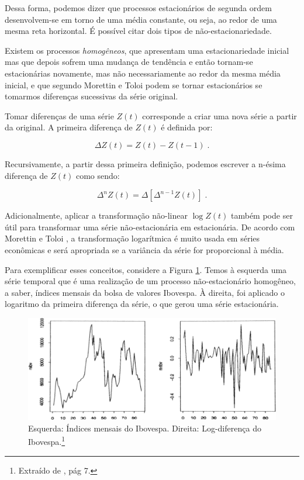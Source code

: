 Dessa forma, podemos dizer que processos estacionários de segunda ordem desenvolvem-se em torno de uma média constante, ou seja, ao redor de uma mesma reta horizontal. É possível citar dois tipos de não-estacionariedade. 

Existem os processos \emph{homogêneos}, que apresentam uma estacionariedade inicial mas que depois sofrem uma mudança de tendência e então tornam-se estacionárias novamente, mas não necessariamente ao redor da mesma média inicial, e que segundo Morettin e Toloi \citep{morettin} podem se tornar estacionários se tomarmos diferenças sucessivas da série original.

Tomar diferenças de uma série $Z(t)$ corresponde a criar uma nova série a partir da original. A primeira diferença de $Z(t)$ é definida por:

\begin{equation}\label{series:2.12}
\Delta Z(t) = Z(t) - Z(t - 1)\;.
\end{equation}

Recursivamente, a partir dessa primeira definição, podemos escrever a n-ésima diferença de $Z(t)$ como sendo:

\begin{equation}\label{series:2.13}
\Delta^n Z(t) = \Delta[\Delta^{n-1} Z(t)]\;.
\end{equation}

Adicionalmente, aplicar a transformação não-linear $\log Z(t)$ também pode ser útil para transformar uma série não-estacionária em estacionária. De acordo com Morettin e Toloi \citep{morettin}, a transformação logarítmica é muito usada em séries econômicas e será apropriada se a variância da série for proporcional à média.

Para exemplificar esses conceitos, considere a Figura \ref{fig:exe_estac}. Temos à esquerda uma série temporal que é uma realização de um processo não-estacionário homogêneo, a saber, índices mensais da bolsa de valores Ibovespa. À direita, foi aplicado o logaritmo da primeira diferença da série, o que gerou uma série estacionária.

\begin{figure}[htb]
\centering
\includegraphics[width=14cm]{figuras/exemplo_estac}
\caption{Esquerda: Índices mensais do Ibovespa. Direita: Log-diferença do Ibovespa.\footnote{Extraído de \citep{morettin}, pág 7.}}
\label{fig:exe_estac}
\end{figure}


